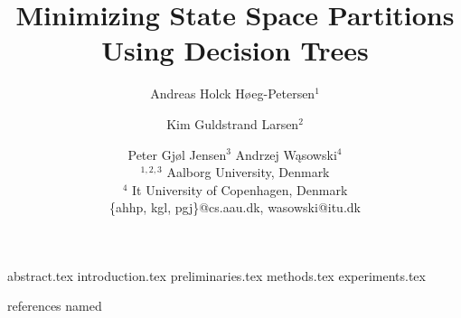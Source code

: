 \documentclass{article}
\title {Minimizing State Space Partitions Using Decision Trees}
\author{%
    Andreas Holck Høeg-Petersen$^1$
    \and
    Kim Guldstrand Larsen$^2$\and
    Peter Gjøl Jensen$^{3}$\And
    Andrzej Wąsowski$^4$\\
    \affiliations
    $^{1,2,3}$ Aalborg University, Denmark\\
    $^4$ It University of Copenhagen, Denmark\\
    \emails
    \{ahhp, kgl, pgj\}@cs.aau.dk,
    wasowski@itu.dk
}
\begin{document}
\maketitle

 {abstract.tex}
 {introduction.tex}
 {preliminaries.tex}
 {methods.tex}
 {experiments.tex}

\newpage

 {references}
 {named}


\end{document}
